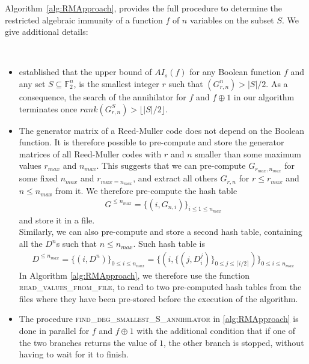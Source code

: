 \documentclass[11pt]{llncs}
\begin{document}
Algorithm~\ref{alg:RMApproach}, provides the full procedure to determine the restricted algebraic immunity of a function $f$ of $n$ variables on the subset $S$. We give additional details:

\begin{remark}~
	\begin{itemize}
		\item \cite{TOSC:CarMeaRot17} established that the upper bound of $AI_s(f)$ for any Boolean function $f$ and any set $S\subseteq \mathbb{F}_2^n$, is the smallest integer $r$ such that $\left(G_{r,n}^n\right) > |S| / 2$. As a consequence, the search of the annihilator for $f$ and $f\oplus 1$ in our algorithm terminates once $rank\left(G_{r,n}^S\right) > \lfloor{|S| / 2}\rfloor$.
		\item The generator matrix of a Reed-Muller code does not depend on the Boolean function. It is therefore possible to pre-compute and store the generator matrices of all Reed-Muller codes with $r$ and $n$ smaller than some maximum values $r_{max}$ and $n_{max}$.
		This suggests that we can pre-compute $G_{r_{max}, n_{max}}$ for some fixed $n_{max}$ and $r_{max = n_{max}}$, and extract all others $G_{r,n}$ for $r \leq r_{max}$ and $n \leq n_{max}$ from it.
		We therefore pre-compute the hash table
		\begin{align*}
		G^{\leq n_{max}} = \{\left(i, G_{n,i}\right)\}_{i \leq 1 \leq n_{max}}
		\end{align*}
		and store it in a file.\\
		Similarly, we can also pre-compute and store a second hash table, containing all the $D^n$s such that $n \leq n_{max}$. Such hash table is
		\begin{align*}\label{eq:degreesHashTable}
		D^{\leq n_{max}} =  \{\left(i,D^{n} \right)\}_{0 \leq i \leq n_{max}} =  \{\left(i, \{ \left(j, D_i^j\right)\}_{0\leq j \leq \lceil{i/2}\rceil} \right)\}_{0 \leq i \leq n_{max}}
		\end{align*}
		In Algorithm \ref{alg:RMApproach}, we therefore use the function \textsc{read\_values\_from\_file}, to read to two pre-computed hash tables from the files where they have been pre-stored before the execution of the algorithm.
		\item The procedure \textsc{find\_deg\_smallest\_S\_annihilator} in \ref{alg:RMApproach} is done in parallel for $f$ and $f\oplus 1$ with the additional condition that if one of the two branches returns the value of $1$, the other branch is stopped, without having to wait for it to finish.
	\end{itemize}	
\end{remark}
\end{document}
